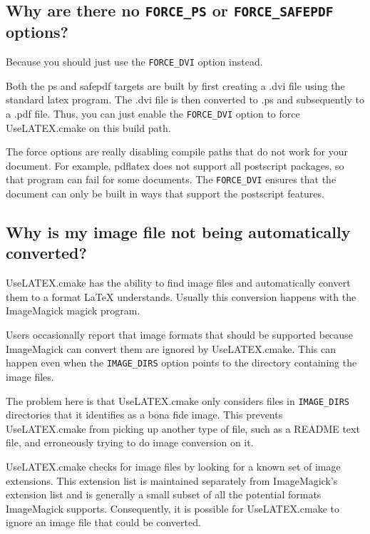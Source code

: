 \documentclass{article}
\newcommand*{\textfile}[1]{\textsf{#1}}
\newcommand*{\textprog}[1]{\textfile{#1}}
\newcommand*{\textcmake}[1]{\texttt{#1}}
\newcommand*{\textmaketarget}[1]{#1}
\newcommand*{\UseLATEX}{\textfile{UseLATEX.cmake}\xspace}
\newcommand*{\latex}{\LaTeX\xspace}
\begin{document}
  \subsection{Why are there no \textcmake{FORCE\_PS} or \textcmake{FORCE\_SAFEPDF} options?}
  \label{sec:Why_are_there_no_FORCE_PS_or_FORCE_SAFEPDF_options}

  Because you should just use the \textcmake{FORCE\_DVI} option instead.

  Both the \textmaketarget{ps} and \textmaketarget{safepdf} targets are
  built by first creating a \textfile{.dvi} file using the standard
  \textprog{latex} program. The \textfile{.dvi} file is then converted to
  \textfile{.ps} and subsequently to a \textfile{.pdf} file. Thus, you can
  just enable the \textcmake{FORCE\_DVI} option to force \UseLATEX on this
  build path.

  The force options are really disabling compile paths that do not work for
  your document. For example, \textprog{pdflatex} does not support all
  postscript packages, so that program can fail for some documents. The
  \textcmake{FORCE\_DVI} ensures that the document can only be built in
  ways that support the postscript features.

  \subsection{Why is my image file not being automatically converted?}
  \label{sec:Why_is_my_image_file_not_being_automatically_converted}

  \UseLATEX has the ability to find image files and automatically convert
  them to a format \latex understands. Usually this conversion happens with
  the ImageMagick \textprog{magick} program.

  Users occasionally report that image formats that should be supported
  because ImageMagick can convert them are ignored by \UseLATEX. This can
  happen even when the \textcmake{IMAGE\_DIRS} option points to the
  directory containing the image files.

  The problem here is that \UseLATEX only considers files in
  \textcmake{IMAGE\_DIRS} directories that it identifies as a bona fide
  image. This prevents \UseLATEX from picking up another type of file, such
  as a README text file, and erroneously trying to do image conversion on
  it.

  \UseLATEX checks for image files by looking for a known set of image
  extensions. This extension list is maintained separately from
  ImageMagick's extension list and is generally a small subset of all the
  potential formats ImageMagick supports. Consequently, it is possible for
  \UseLATEX to ignore an image file that could be converted.
\end{document}
